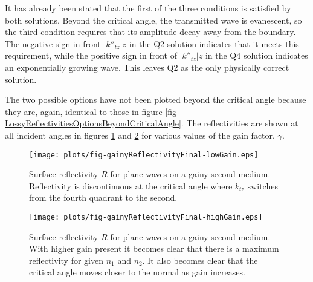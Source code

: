 \documentclass[12pt]{uthesis-v12}
\begin{document}
It has already been stated that the first of the three conditions is satisfied by both solutions. Beyond the critical angle, the transmitted wave is evanescent, so the third condition requires that its amplitude decay away from the boundary. The negative sign in front $|k''_{tz}|z$ in the Q2 solution indicates that it meets this requirement, while the positive sign in front of $|k''_{tz}|z$ in the Q4 solution indicates an exponentially growing wave.  This leaves Q2 as the only physically correct solution.

The two possible options have not been plotted beyond the critical angle because they are, again, identical to those in figure \ref{fig-LossyReflectivitiesOptionsBeyondCriticalAngle}. The reflectivities are shown at all incident angles in figures \ref{fig-gainyReflectivityFinal-lowGain} and \ref{fig-gainyReflectivityFinal-highGain} for various values of the gain factor, $\gamma$.

\begin{figure}[htb]
\centering
\texttt{[image: plots/fig-gainyReflectivityFinal-lowGain.eps]}
\caption[Final Reflectivity for Plane Waves -- Low Gain]{Surface reflectivity $R$ for plane waves on a gainy second medium. Reflectivity is discontinuous at the critical angle where $k_{tz}$ switches from the fourth quadrant to the second.
 \label{fig-gainyReflectivityFinal-lowGain}}
\end{figure}

\begin{figure}[htb]
\centering
\texttt{[image: plots/fig-gainyReflectivityFinal-highGain.eps]}
\caption[Final Reflectivity for Plane Waves -- High Gain]{Surface reflectivity $R$ for plane waves on a gainy second medium. With higher gain present it becomes clear that there is a maximum reflectivity for given $n_1$ and $n_2$. It also becomes clear that the critical angle moves closer to the normal as gain increases.
 \label{fig-gainyReflectivityFinal-highGain}}
\end{figure}
\end{document}
